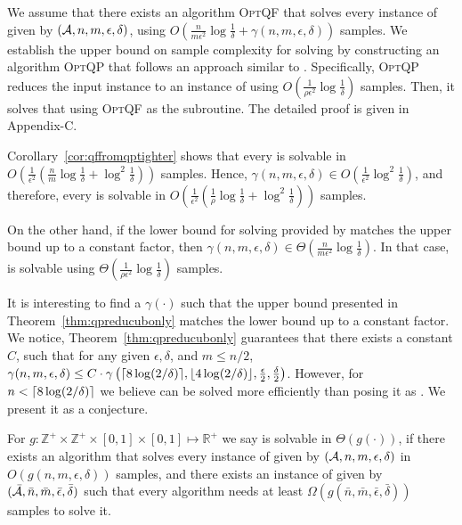 We assume that there exists an algorithm \textsc{OptQF} that solves
every instance of \QF  given by $(\mathcal{A}, n, m, \epsilon, \delta)$,
using $O\left(\frac{n}{m\epsilon^2}\log\frac{1}{\delta} + \gamma(n,m,\epsilon,\delta)\right)$ samples.
We establish the upper bound on sample complexity for solving \QP by constructing an  algorithm \textsc{OptQP}
that follows an approach similar to \PPP. Specifically, \textsc{OptQP} reduces the input \QP instance 
to an instance of \QF 
using $O\left(\frac{1}{\rho\epsilon^2}\log\frac{1}{\delta}\right)$ samples. Then, it solves that 
\QF  using \textsc{OptQF} as the subroutine. The detailed proof is given in Appendix-C.

\begin{corollary}
\label{cor:effectoptqf}
Corollary~\ref{cor:qffromqptighter} shows that every \QF is solvable in $O\left(\frac{1}{\epsilon^2}\left(\frac{n}{m}\log\frac{1}{\delta} + \log^2\frac{1}{\delta}\right)\right)$ samples.
Hence, $\gamma(n,m,\epsilon,\delta) \in O\left(\frac{1}{\epsilon^2}\log^2\frac{1}{\delta}\right)$,
and therefore, every \QP is solvable in $O\left(\frac{1}{\epsilon^2}\left(\frac{1}{\rho}\log\frac{1}{\delta} + \log^2\frac{1}{\delta}\right)\right)$ samples.

On the other hand, if the lower bound for solving \QF provided by \citet{bib:arcsk2017} matches the upper bound up to a constant factor, then $\gamma(n,m,\epsilon,\delta) \in \Theta\left(\frac{n}{m\epsilon^2}\log\frac{1}{\delta}\right)$. In that case, \QP is solvable using $\Theta\left(\frac{1}{\rho\epsilon^2}\log\frac{1}{\delta}\right)$ samples.
\end{corollary}


It is interesting to find a $\gamma(\cdot)$ such that the upper bound presented in Theorem~\ref{thm:qpreducubonly}
matches the lower bound up to a constant factor. We notice, Theorem~\ref{thm:qpreducubonly} guarantees that there exists a constant $C$,
such that for any given $\epsilon, \delta$, and $m \leq n/2$,
$\gamma(n ,m, \epsilon, \delta) \leq C \cdot \gamma\left(\lceil8\log(2/\delta)\rceil, \lfloor4\log(2/\delta)\rfloor, \frac{\epsilon}{2}, \frac{\delta}{2}\right)$. However, for $n < \lceil8\log(2/\delta)\rceil$ %
we believe \QF can be solved more efficiently than posing it as \QP. We present it as a conjecture.

\begin{definition}
For $g: \mathbb{Z}^+ \times \mathbb{Z}^+ \times [0,1] \times [0,1] \mapsto \mathbb{R}^+$ we say \QF is solvable in $\Theta(g(\cdot))$, if there exists an algorithm that
solves every instance of \QF given by $(\mathcal{A}, n, m, \epsilon, \delta)$ in $O(g(n,m,\epsilon,\delta))$ samples,
and there exists an instance of \QF given by $(\bar{\mathcal{A}}, \bar{n}, \bar{m}, \bar{\epsilon}, \bar{\delta})$ such that every algorithm
needs at least $\Omega(g(\bar{n},\bar{m},\bar{\epsilon},\bar{\delta}))$ samples to solve it.
\end{definition}

